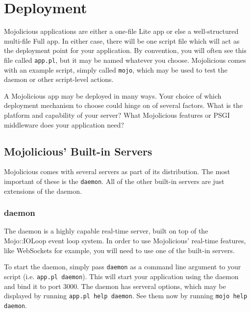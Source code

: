 
\section{Deployment}

Mojolicious applications are either a one-file Lite app
or else a well-structured multi-file Full app.
In either case, there will be one script file which will act as the deployment point for your application.
By convention, you will often see this file called \verb!app.pl!, but it may be named whatever you choose.
Mojolicious comes with an example script, simply called \verb!mojo!, which may be used to test the daemon or other script-level actions.

A Mojolicious app may be deployed in many ways.
Your choice of which deployment mechanism to choose could hinge on of several factors.
What is the platform and capability of your server?
What Mojolicious features or PSGI middleware does your application need?

\subsection{Mojolicious' Built-in Servers}

Mojolicious comes with several servers as part of its distribution.
The most important of these is the \verb!daemon!.
All of the other built-in servers are just extensions of the daemon.

\subsubsection{daemon}

The daemon is a highly capable real-time server, built on top of the Mojo::IOLoop event loop system.
In order to use Mojolicious' real-time features, like WebSockets for example,
you will need to use one of the built-in servers.

To start the daemon, simply pass \verb!daemon! as a command line argument to your script (i.e. \verb!app.pl daemon!). 
This will start your application using the daemon and bind it to port 3000.
The daemon has serveral options, which may be displayed by running \verb!app.pl help daemon!.
See them now by running \verb!mojo help daemon!.

